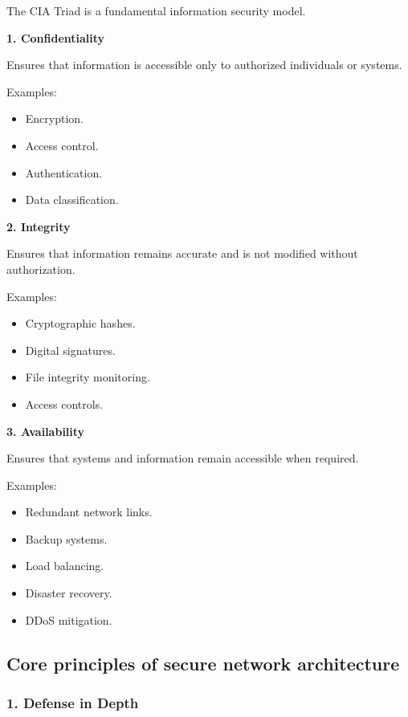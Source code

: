 The CIA Triad is a fundamental information security model.

\textbf{1. Confidentiality}

Ensures that information is accessible only to authorized individuals or systems.

Examples:

\begin{itemize}
\item Encryption.
\item Access control.
\item Authentication.
\item Data classification.
\end{itemize}

\textbf{2. Integrity}

Ensures that information remains accurate and is not modified without authorization.

Examples:

\begin{itemize}
\item Cryptographic hashes.
\item Digital signatures.
\item File integrity monitoring.
\item Access controls.
\end{itemize}

\textbf{3. Availability}

Ensures that systems and information remain accessible when required.

Examples:

\begin{itemize}
\item Redundant network links.
\item Backup systems.
\item Load balancing.
\item Disaster recovery.
\item DDoS mitigation.
\end{itemize}


\subsection{Core principles of secure network architecture}

\subsubsection{1. Defense in Depth}

